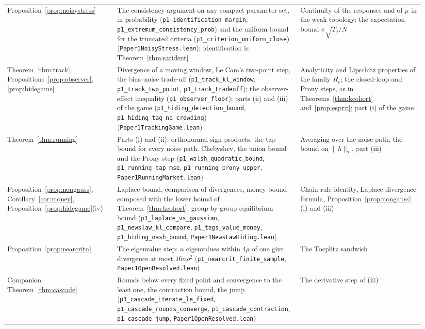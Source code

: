 \documentclass[12pt]{article}
\theoremstyle{definition}
\theoremstyle{remark}
\begin{document}
\begin{longtable}{>{\raggedright\arraybackslash}p{}>{\raggedright\arraybackslash}p{}>{\raggedright\arraybackslash}p{}}
Proposition~\ref{prop:noisystress} & The consistency argument on any compact parameter set, in probability (\texttt{p1\_identification\_margin}, \texttt{p1\_extremum\_consistency\_prob}) and the uniform bound for the truncated criteria (\texttt{p1\_criterion\_uniform\_close}) (\nolinkurl{Paper1NoisyStress.lean}); identification is Theorem~\ref{thm:satident} & Continuity of the responses and of $\tilde\mu$ in the weak topology; the expectation bound $\sigma\sqrt{T_j/N}$\\
Theorem~\ref{thm:track}, Propositions~\ref{prop:observer}, \ref{prop:hidegame} & Divergence of a moving window, Le Cam's two-point step, the bias--noise trade-off (\texttt{p1\_track\_kl\_window}, \texttt{p1\_track\_two\_point}, \texttt{p1\_track\_tradeoff}); the observer-effect inequality (\texttt{p1\_observer\_floor}); parts (ii) and (iii) of the game (\texttt{p1\_hiding\_detection\_bound}, \texttt{p1\_hiding\_tag\_no\_crowding}) (\nolinkurl{Paper1TrackingGame.lean}) & Analyticity and Lipschitz properties of the family $R_c$; the closed-loop and Prony steps, as in Theorems~\ref{thm:kcohort} and~\ref{prop:esprit}; part (i) of the game\\
Theorem~\ref{thm:running} & Parts (i) and (ii): orthonormal sign products, the tap bound for every noise path, Chebyshev, the union bound and the Prony step (\texttt{p1\_walsh\_quadratic\_bound}, \texttt{p1\_running\_tap\_mse}, \texttt{p1\_running\_prony\_upper}, \nolinkurl{Paper1RunningMarket.lean}) & Averaging over the noise path, the bound on $\|h\|_2$, part (iii)\\
Proposition~\ref{prop:nongauss}, Corollary~\ref{cor:money}, Proposition~\ref{prop:hidegame}(iv) & Laplace bound, comparison of divergences, money bound composed with the lower bound of Theorem~\ref{thm:kcohort}, group-by-group equilibrium bound (\texttt{p1\_laplace\_vs\_gaussian}, \texttt{p1\_newslaw\_kl\_compare}, \texttt{p1\_tags\_value\_money}, \texttt{p1\_hiding\_nash\_bound}, \nolinkurl{Paper1NewsLawHiding.lean}) & Chain-rule identity, Laplace divergence formula, Proposition~\ref{prop:nongauss}(i) and (iii)\\
Proposition~\ref{prop:nearcritn} & The eigenvalue step: $n$ eigenvalues within $4\rho$ of one give divergence at most $16n\rho^2$ (\texttt{p1\_nearcrit\_finite\_sample}, \nolinkurl{Paper1OpenResolved.lean}) & The Toeplitz sandwich\\
Companion Theorem~\ref{thm:cascade} & Rounds below every fixed point and convergence to the least one, the contraction bound, the jump (\texttt{p1\_cascade\_iterate\_le\_fixed}, \texttt{p1\_cascade\_rounds\_converge}, \texttt{p1\_cascade\_contraction}, \texttt{p1\_cascade\_jump}, \nolinkurl{Paper1OpenResolved.lean}) & The derivative step of (iii)\\

\end{longtable}
\end{document}
